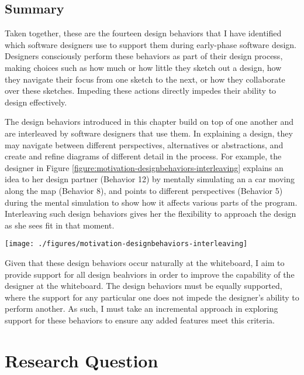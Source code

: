 \section{Summary}

Taken together, these are the fourteen design behaviors that I have identified which software designers use to support them during early-phase software design. Designers consciously perform these behaviors as part of their design process, making choices such as how much or how little they sketch out a design, how they navigate their focus from one sketch to the next, or how they collaborate over these sketches. Impeding these actions directly impedes their ability to design effectively.

The design behaviors introduced in this chapter build on top of one another and are interleaved by software designers that use them. In explaining a design, they may navigate between different perspectives, alternatives or abstractions, and create and refine diagrams of different detail in the process. For example, the designer in Figure \ref{figure:motivation-designbehaviors-interleaving} explains an idea to her design partner (Behavior 12) by mentally simulating an a car moving along the map (Behavior 8), and points to different perspectives (Behavior 5) during the mental simulation to show how it affects various parts of the program. Interleaving such design behaviors gives her the flexibility to approach the design as she sees fit in that moment.
 
 \begin{figure*}[tbh]
  \centering
  \texttt{[image: ./figures/motivation-designbehaviors-interleaving]}
  \caption{The designer interleaves many design behaviors by using several sketches.}
  \label{figure:motivation-designbehaviors-interleaving}
\end{figure*} 

Given that these design behaviors occur naturally at the whiteboard, I aim to provide support for all design beahviors in order to improve the capability of the designer at the whiteboard. The design behaviors must be equally supported, where the support for any particular one does not impede the designer's ability to perform another. As such, I must take an incremental approach in exploring support for these behaviors to ensure any added features meet this criteria.

\chapter{Research Question}
\label{chapter:research-question}

